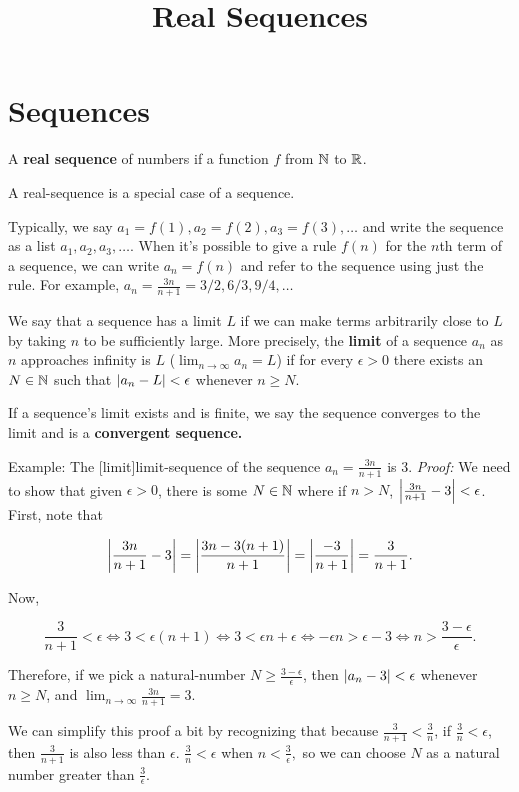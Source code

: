 \documentclass{article}
\title{Real Sequences}
\begin{document}
\section{Sequences}

\begin{definition}
A \textbf{real sequence} of numbers if a \@{function} $f$ from $\mathbb{N}$ to $\mathbb{R}$.
\end{definition}

\begin{note}\label{real-sequence-notation}
A \@{real-sequence} is a special case of a \@{sequence}.

Typically, we say $a_1 = f(1), a_2 = f(2), a_3 = f(3), \dots$ and write the sequence as a list $a_1, a_2, a_3, \dots.$ When it's possible to give a rule $f(n)$ for the $n$th term of a sequence, we can write $a_n = f(n)$ and refer to the sequence using just the rule. For example, $a_n = \frac{3n}{n+1} = 3/2, 6/3, 9/4, \dots$
\end{note}

We say that a \@{sequence} has a limit $L$ if we can make terms arbitrarily close to $L$ by taking $n$ to be sufficiently large. More precisely, the \textbf{limit} of a sequence $a_n$ as $n$ approaches infinity is $L$ ($\lim_{n \to \infty} a_n = L$) if for every $\epsilon > 0$ there exists an $N \in \mathbb{N}$ such that $\left| a_n -L \right| < \epsilon$ whenever $n \geq N$.

If a sequence's limit exists and is finite, we say the sequence \@{converges} to the limit and is a \textbf{convergent sequence.}

Example: The \@[limit]{limit-sequence} of the sequence $a_n = \frac{3n}{n+1}$ is $3$. \emph{Proof:} We need to show that given $\epsilon > 0$, there is some $N \in \mathbb{N}$ where if $n > N$, $\left| \frac{3n}{n+1} - 3 \right| < \epsilon$. First, note that

\[ \left| \frac{3n}{n+1} - 3 \right| = \left| \frac{3n - 3(n+1)}{n+1} \right| = \left| \frac{-3}{n+1} \right| = \frac{3}{n+1}. \]

Now,

\[ \frac{3}{n+1} < \epsilon \iff 3 < \epsilon (n+1) \iff 3 < \epsilon n + \epsilon \iff -\epsilon n > \epsilon - 3 \iff n > \frac{3 - \epsilon}{\epsilon}. \]

Therefore, if we pick a \@{natural-number} $N \geq \frac{3 - \epsilon}{\epsilon}$, then $\left| a_n - 3 \right| < \epsilon$ whenever $n \geq N$, and $\lim_{n \to \infty} \frac{3n}{n+1} = 3.$

We can simplify this proof a bit by recognizing that because $\frac{3}{n+1} < \frac{3}{n}$, if $\frac{3}{n} < \epsilon$, then $\frac{3}{n+1}$ is also less than $\epsilon$. $\frac{3}{n} < \epsilon$ when $n < \frac{3}{\epsilon},$ so we can choose $N$ as a natural number greater than $\frac{3}{\epsilon}.$
\end{document}
